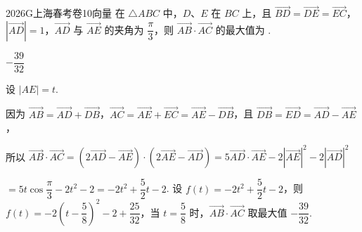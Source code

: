 
\begin{problem}{2026}{G}{上海春考卷}{10}{向量}
在 $\triangle ABC$ 中，$D$、$E$ 在 $BC$ 上，且 $\overrightarrow{BD}=\overrightarrow{DE}=\overrightarrow{EC}$，$|\overrightarrow{AD}|=1$，$\overrightarrow{AD}$ 与 $\overrightarrow{AE}$ 的夹角为 $\dfrac{\pi}{3}$，则 $\overrightarrow{AB}\cdot\overrightarrow{AC}$ 的最大值为 \underline{\hspace{4em}}.
\end{problem}

\begin{answer}
$-\dfrac{39}{32}$
\end{answer}

\begin{solutions}

 设 $|AE|=t$.  

因为 $\overrightarrow{AB}=\overrightarrow{AD}+\overrightarrow{DB}$，$\overrightarrow{AC}=\overrightarrow{AE}+\overrightarrow{EC}=\overrightarrow{AE}-\overrightarrow{DB}$，且 $\overrightarrow{DB}=\overrightarrow{ED}=\overrightarrow{AD}-\overrightarrow{AE}$，  

所以 $\overrightarrow{AB}\cdot\overrightarrow{AC}=(2\overrightarrow{AD}-\overrightarrow{AE})\cdot(2\overrightarrow{AE}-\overrightarrow{AD})=5\overrightarrow{AD}\cdot\overrightarrow{AE}-2|\overrightarrow{AE}|^{2}-2|\overrightarrow{AD}|^{2}$  

$=5t\cos\dfrac{\pi}{3}-2t^{2}-2=-2t^{2}+\dfrac{5}{2}t-2$.  设 $f(t)=-2t^{2}+\dfrac{5}{2}t-2$，则 $f(t)=-2\left(t-\dfrac{5}{8}\right)^{2}-2+\dfrac{25}{32}$，当 $t=\dfrac{5}{8}$ 时，$\overrightarrow{AB}\cdot\overrightarrow{AC}$ 取最大值 $-\dfrac{39}{32}$.
\end{solutions}